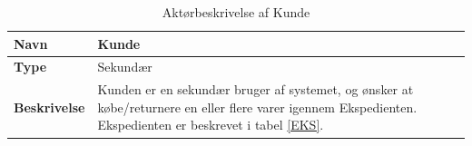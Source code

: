 \begin{table}[H]
	\label{KD}
	\begin{tabularx}{\textwidth}{|l|X|}
		\hline
		\textbf{Navn} & Kunde \\
		\hline
		\textbf{Type} & Sekundær \\
		\hline
		\textbf{Beskrivelse} & Kunden er en sekundær bruger af systemet, og ønsker at købe/returnere en eller flere varer igennem Ekspedienten. Ekspedienten er beskrevet i tabel \ref{EKS}.   \\
		\hline
	\end{tabularx}
	\captionsetup{justification=raggedright,singlelinecheck=false}
	\caption{Aktørbeskrivelse af Kunde}
	\label{tab:AktKu}
\end{table}

